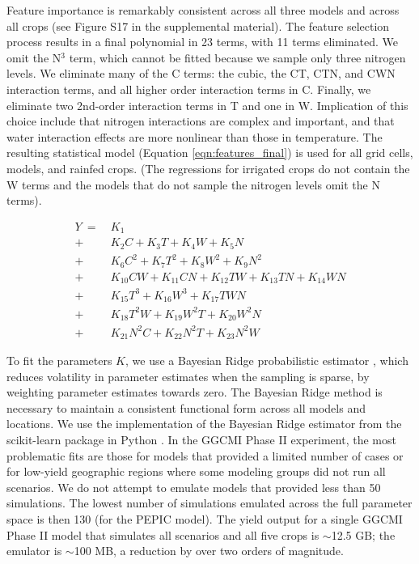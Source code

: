 \documentclass[gmd, manuscript]{copernicus} %
\begin{document}
Feature importance is remarkably consistent across all three models and across all crops (see Figure S17 in the supplemental material). The feature selection process results in a final polynomial in 23 terms, with 11 terms eliminated. We omit the N$^3$ term, which cannot be fitted because we sample only three nitrogen levels. We eliminate many of the C terms: the cubic, the CT, CTN, and CWN interaction terms, and all higher order interaction terms in C. Finally, we eliminate two 2nd-order interaction terms in T and one in W. Implication of this choice include that nitrogen interactions are complex and important, and that water interaction effects are more nonlinear than those in temperature. The resulting statistical model (Equation \ref{eqn:features_final}) is used for all grid cells, models, and rainfed crops. (The regressions for irrigated crops do not contain the W terms and the models that do not sample the nitrogen levels omit the N terms).

\begin{align}
    \label{eqn:features_final}
    Y\ = \ & K_{1}  \\
		+ \ & K_{2}  C     + K_{3}  T     + K_{4}  W     + K_{5}  N   \nonumber \\
		+ \ & K_{6}  C^2   + K_{7}  T^2   + K_{8}  W^2   + K_{9}  N^2 \nonumber \\
		+ \ & K_{10} C W   + K_{11} C N   + K_{12} T W   + K_{13} T N + K_{14} W N \nonumber \\ %
		+ \ & K_{15} T^3   + K_{16} W^3   + K_{17} T W N  \nonumber \\ %
		+ \ & K_{18} T^2 W + K_{19} W^2 T + K_{20} W^2 N  \nonumber \\ %
		+ \ & K_{21} N^2 C + K_{22} N^2 T + K_{23} N^2 W  \nonumber    %
\end{align}

To fit the parameters $K$, we use a Bayesian Ridge probabilistic estimator \citep{MacKay91}, which reduces volatility in parameter estimates when the sampling is sparse, by weighting parameter estimates towards zero. The Bayesian Ridge method is necessary to maintain a consistent functional form across all models and locations. We use the implementation of the Bayesian Ridge estimator from the scikit-learn package in Python \citep{scikit-learn}. In the GGCMI Phase II experiment, the most problematic fits are those for models that provided a limited number of cases or for low-yield geographic regions where some modeling groups did not run all scenarios. We do not attempt to emulate models that provided less than 50 simulations. The lowest number of simulations emulated across the full parameter space is then 130 (for the PEPIC model). The yield output for a single GGCMI Phase II model that simulates all scenarios and all five crops is $\sim$12.5 GB; the emulator is $\sim$100 MB, a reduction by over two orders of magnitude. 
\end{document}
